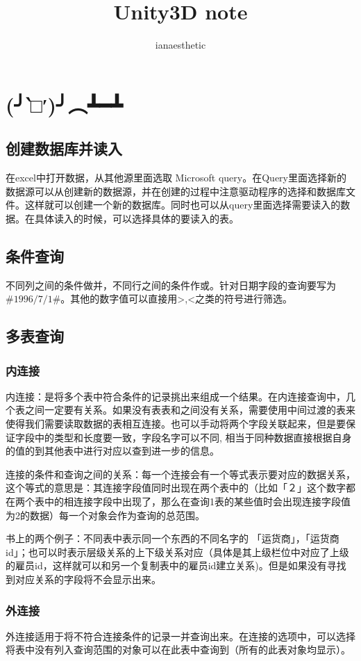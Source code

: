 \documentclass[10pt, a4paper]{article}
\author{ianaesthetic}
\title{Unity3D note}
\begin{document}
    \section{(╯‵□′)╯︵┻━┻}
        \subsection{创建数据库并读入}
            在excel中打开数据，从其他源里面选取 Microsoft query。在Query里面选择新的数据源可以从创建新的数据源，并在创建的过程中注意驱动程序的选择和数据库文件。这样就可以创建一个新的数据库。同时也可以从query里面选择需要读入的数据。在具体读入的时候，可以选择具体的要读入的表。 
        \subsection{条件查询}
            不同列之间的条件做并，不同行之间的条件作或。针对日期字段的查询要写为 $\#1996/7/1\#$。其他的数字值可以直接用>,<之类的符号进行筛选。

        \subsection{多表查询}
            \subsubsection{内连接}
                内连接：是将多个表中符合条件的记录挑出来组成一个结果。在内连接查询中，几个表之间一定要有关系。如果没有表表和之间没有关系，需要使用中间过渡的表来使得我们需要读取数据的表相互连接。也可以手动将两个字段关联起来，但是要保证字段中的类型和长度要一致，字段名字可以不同, 相当于同种数据直接根据自身的值的到其他表中进行对应以查到进一步的信息。

                连接的条件和查询之间的关系：每一个连接会有一个等式表示要对应的数据关系，这个等式的意思是：其连接字段值同时出现在两个表中的（比如「２」这个数字都在两个表中的相连接字段中出现了，那么在查询1表的某些值时会出现连接字段值为2的数据）每一个对象会作为查询的总范围。
            
                书上的两个例子：不同表中表示同一个东西的不同名字的 「运货商」，「运货商id」；也可以时表示层级关系的上下级关系对应（具体是其上级栏位中对应了上级的雇员id，这样就可以和另一个复制表中的雇员id建立关系)。但是如果没有寻找到对应关系的字段将不会显示出来。
            \subsubsection{外连接}
                外连接适用于将不符合连接条件的记录一并查询出来。在连接的选项中，可以选择将表中没有列入查询范围的对象可以在此表中查询到（所有的此表对象均显示）。
\end{document}
